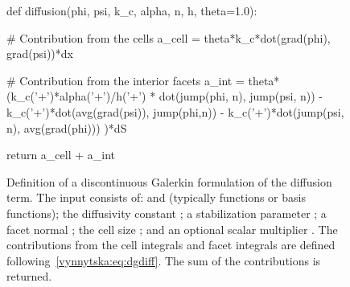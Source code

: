 \begin{figure}
  \begin{center}
    \begin{python}
def diffusion(phi, psi, k_c, alpha, n, h, theta=1.0):

    # Contribution from the cells
    a_cell = theta*k_c*dot(grad(phi), grad(psi))*dx

    # Contribution from the interior facets
    a_int = theta*(k_c('+')*alpha('+')/h('+')
                   * dot(jump(phi, n), jump(psi, n))
        - k_c('+')*dot(avg(grad(psi)), jump(phi,n))
        - k_c('+')*dot(jump(psi, n), avg(grad(phi)))
        )*dS

    return a_cell + a_int
    \end{python}
  \end{center}
  \caption{Definition of a discontinuous Galerkin formulation of the
    diffusion term. The input consists of:  and 
    (typically functions or basis functions); the diffusivity
    constant ; a stabilization parameter ; a
    facet normal ; the cell size ; and an optional
    scalar multiplier . The contributions from the cell
    integrals and facet integrals are defined
    following~\eqref{vynnytska:eq:dgdiff}. The sum of the
    contributions is returned.}
  \label{vynnytska:fig:diffusion}
\end{figure}


